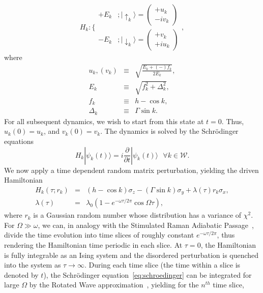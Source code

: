 \documentclass[a4paper,10pt]{report}
\begin{document}
\begin{equation}
\label{eq:unpert:esystem}
H_k:\bigg\{\begin{array}{ll}
           +E_k &;|\uparrow_k\rangle=\begin{pmatrix}
                                    +u_k\\
                                    -iv_k
                                   \end{pmatrix}\\
          -E_k &; |\downarrow_k\rangle = \begin{pmatrix}
                                           +v_k\\
                                           +iu_k
                                          \end{pmatrix}
           \end{array},
\end{equation}
where
\begin{eqnarray}
\label{eq:ukvk}
 u_k,(v_k) &\equiv& \sqrt{\frac{E_k+(-) f_k}{2E_k}},\nonumber \\
 E_k &\equiv& \sqrt{f^2_k+\Delta^2_k},\nonumber \\
 f_k &\equiv& h -\cos{k},\nonumber \\
 \Delta_k &\equiv& \Gamma\sin{k}.
\end{eqnarray}
For all subsequent dynamics, we wish to start from this state at $t=0$. Thus, $u_k(0)=u_k$, and $v_k(0)=v_k$. The dynamics is solved by the Schr\"odinger equations
\begin{equation}
 \label{eq:schroedinger}
H_k|\psi_k(t)\rangle = i\frac{\partial}{\partial t}|\psi_k(t)\rangle \mbox{  } \forall k\in\mathcal{W}.
\end{equation}
We now apply a time dependent random matrix perturbation, yielding the driven Hamiltonian
\begin{eqnarray}
\label{eq:hamilt:driven}
H_k(\tau; r_k)    &=& \left(h-\cos{k}\right)\sigma_z-\left(\Gamma\sin{k}\right)\sigma_y+\lambda(\tau)r_k\sigma_x,\nonumber \\
\lambda(\tau)&=&\lambda_0\left(1-e^{-{\omega \tau}/{2\pi}}\cos{\Omega \tau}\right),
\end{eqnarray}
where $r_k$ is a Gaussian random number whose distribution has a variance of $\chi^2$. For $\Omega\gg\omega$, we can, in analogy with the Stimulated Raman Adiabatic Passage~\cite{myoldpapers}, divide the time evolution into time slices of roughly constant $e^{-{\omega \tau}/{2\pi}}$, thus rendering the Hamiltonian time periodic in each slice. At $\tau=0$, the Hamiltonian is fully integrable as an Ising system and the disordered perturbation is quenched into the system as $\tau\rightarrow\infty$. During each time slice (the time within a slice is denoted by $t$), the Schr\"odinger equation\ \ref{eq:schroedinger} can be integrated for large $\Omega$ by the Rotated Wave approximation~\cite{arnab1}, yielding for the $n^{th}$ time slice,
\end{document}
